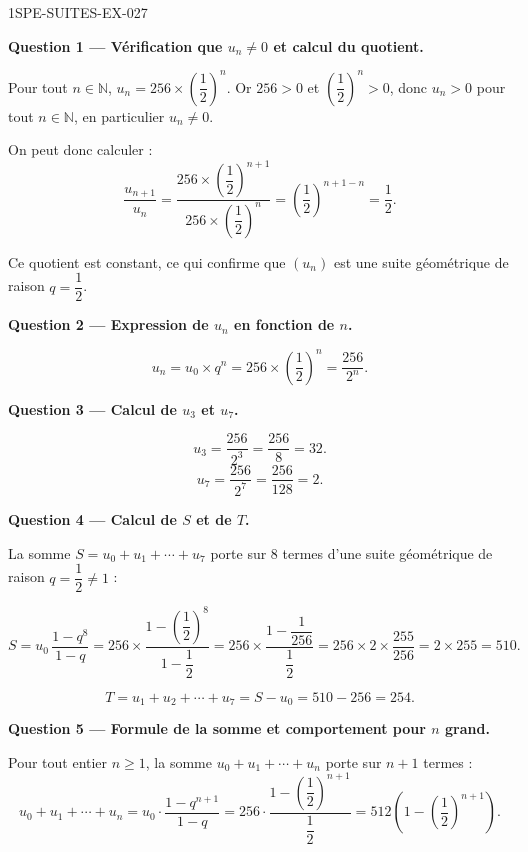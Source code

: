 \begin{corrige}{1SPE-SUITES-EX-027}

\textbf{Question 1 — Vérification que $u_n \neq 0$ et calcul du quotient.}

Pour tout $n \in \mathbb{N}$, $u_n = 256 \times \left(\dfrac{1}{2}\right)^n$. Or $256 > 0$ et $\left(\dfrac{1}{2}\right)^n > 0$, donc $u_n > 0$ pour tout $n \in \mathbb{N}$, en particulier $u_n \neq 0$.

On peut donc calculer :
\[
  \frac{u_{n+1}}{u_n} = \frac{256 \times \left(\dfrac{1}{2}\right)^{n+1}}{256 \times \left(\dfrac{1}{2}\right)^n} = \left(\frac{1}{2}\right)^{n+1-n} = \frac{1}{2}.
\]


Ce quotient est constant, ce qui confirme que $(u_n)$ est une suite géométrique de raison $q = \dfrac{1}{2}$.

\medskip
\textbf{Question 2 — Expression de $u_n$ en fonction de $n$.}

\[
  u_n = u_0 \times q^n = 256 \times \left(\frac{1}{2}\right)^n = \frac{256}{2^n}.
\]

\medskip
\textbf{Question 3 — Calcul de $u_3$ et $u_7$.}

\[
  u_3 = \frac{256}{2^3} = \frac{256}{8} = 32.
\]
\[
  u_7 = \frac{256}{2^7} = \frac{256}{128} = 2.
\]

\medskip
\textbf{Question 4 — Calcul de $S$ et de $T$.}

La somme $S = u_0 + u_1 + \cdots + u_7$ porte sur $8$ termes d'une suite géométrique de raison $q = \dfrac{1}{2} \neq 1$ :


\[
  S = u_0 \, \frac{1 - q^{8}}{1 - q} = 256 \times \frac{1 - \left(\dfrac{1}{2}\right)^8}{1 - \dfrac{1}{2}} = 256 \times \frac{1 - \dfrac{1}{256}}{\dfrac{1}{2}} = 256 \times 2 \times \frac{255}{256} = 2 \times 255 = 510.
\]

\[
  T = u_1 + u_2 + \cdots + u_7 = S - u_0 = 510 - 256 = 254.
\]

\medskip
\textbf{Question 5 — Formule de la somme et comportement pour $n$ grand.}

Pour tout entier $n \geq 1$, la somme $u_0 + u_1 + \cdots + u_n$ porte sur $n+1$ termes :
\[
  u_0 + u_1 + \cdots + u_n = u_0 \cdot \frac{1 - q^{n+1}}{1 - q} = 256 \cdot \frac{1 - \left(\dfrac{1}{2}\right)^{n+1}}{\dfrac{1}{2}} = 512 \left(1 - \left(\frac{1}{2}\right)^{n+1}\right).
\]


\end{corrige}
